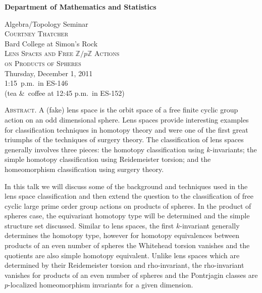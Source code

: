 \documentclass[12pt]{article}
\begin{document}
\noindent\hspace{-28px}%
\hfill\textsf{\textbf{\footnotesize%
Department of Mathematics and Statistics}}\bigskip\bigskip

\begin{center}\Large
  \textsf{{\huge Algebra/Topology Seminar}}\\[2\bigskipamount]
  \textsc{Courtney Thatcher}\\
  {\large Bard College at Simon's Rock}\\[\bigskipamount]
  \textsc{Lens Spaces and Free $\mathbb{Z}/p\mathbb{Z}$ Actions\\ on Products of Spheres}\\[\bigskipamount]
  Thursday, December 1, 2011\\ 1:15~p.m.\ in ES-146\\
  (tea \&\ coffee at 12:45 p.m.\ in ES-152)
\end{center}\bigskip

\large\noindent\textsc{Abstract.}
A (fake) lens space is the orbit space of a free finite cyclic group action on an odd dimensional sphere.  Lens spaces provide interesting examples for classification techniques in homotopy theory and were one of the first great triumphs of the techniques of surgery theory.  The classification of lens spaces generally involves three pieces: the homotopy classification using $k$-invariants; the simple homotopy classification using Reidemeister torsion; and the homeomorphism classification using surgery theory.

In this talk we will discuss some of the background and techniques used in the lens space classification and then extend the question to the classification of free cyclic large prime order group actions on products of spheres.  In the product of spheres case, the equivariant homotopy type will be determined and the simple structure set discussed. Similar to lens spaces, the first $k$-invariant generally determines the homotopy type, however for homotopy equivalences between products of an even number of spheres the Whitehead torsion vanishes and the quotients are also simple homotopy equivalent. Unlike lens spaces which are determined by their Reidemeister torsion and rho-invariant, the rho-invariant vanishes for products of an even number of spheres and the Pontrjagin classes are $p$-localized homeomorphism invariants for a given dimension.
\end{document}
